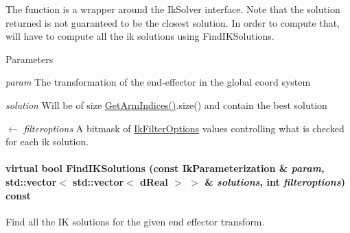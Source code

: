 The function is a wrapper around the IkSolver interface. Note that the solution returned is not guaranteed to be the closest solution. In order to compute that, will have to compute all the ik solutions using FindIKSolutions. 
\begin{DoxyParams}{Parameters}
\item[{\em param}]The transformation of the end-\/effector in the global coord system \item[{\em solution}]Will be of size \hyperlink{classOpenRAVE_1_1RobotBase_1_1Manipulator_ade23a90fcb4102d98f20dddad76ded75}{GetArmIndices()}.size() and contain the best solution \item[\mbox{$\leftarrow$} {\em filteroptions}]A bitmask of \hyperlink{namespaceOpenRAVE_a89401ff7c557d6d1ede96b550fb22bdc}{IkFilterOptions} values controlling what is checked for each ik solution. \end{DoxyParams}
\hypertarget{classOpenRAVE_1_1RobotBase_1_1Manipulator_a89829fe0eeca1eb5ca8424bc8575b346}{
\paragraph[{FindIKSolutions}]{\setlength{\rightskip}{0pt plus 5cm}virtual bool FindIKSolutions (const {\bf IkParameterization} \& {\em param}, \/  std::vector$<$ std::vector$<$ dReal $>$ $>$ \& {\em solutions}, \/  int {\em filteroptions}) const}\hfill}
\label{classOpenRAVE_1_1RobotBase_1_1Manipulator_a89829fe0eeca1eb5ca8424bc8575b346}


Find all the IK solutions for the given end effector transform. 


